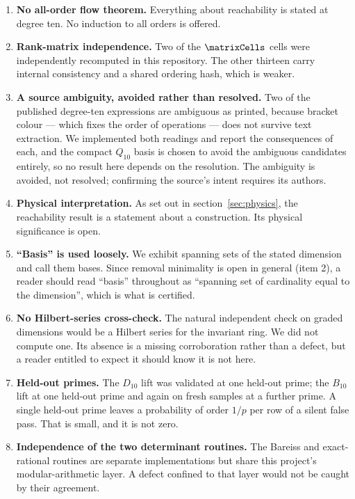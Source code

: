 \documentclass[11pt,a4paper]{article}
\theoremstyle{definition}
\theoremstyle{remark}
\newcommand{\Dten}{D_{10}}
\newcommand{\Qten}{Q_{10}}
\newcommand{\Bten}{B_{10}}
\begin{document}
\begin{enumerate}
\item \textbf{No all-order flow theorem.} Everything about reachability is stated
at degree ten. No induction to all orders is offered.

\item \textbf{Rank-matrix independence.} Two of the $\matrixCells$ cells were
independently recomputed in this repository. The other thirteen carry internal
consistency and a shared ordering hash, which is weaker.

\item \textbf{A source ambiguity, avoided rather than resolved.} Two of the
published degree-ten expressions are ambiguous as printed, because bracket colour
--- which fixes the order of operations --- does not survive text extraction. We
implemented both readings and report the consequences of each, and the compact
$\Qten$ basis is chosen to avoid the ambiguous candidates entirely, so no result
here depends on the resolution. The ambiguity is avoided, not resolved;
confirming the source's intent requires its authors.

\item \textbf{Physical interpretation.} As set out in
section~\ref{sec:physics}, the reachability result is a statement about a
construction. Its physical significance is open.

\item \textbf{``Basis'' is used loosely.} We exhibit spanning sets of the stated
dimension and call them bases. Since removal minimality is open in general
(item 2), a reader should read ``basis'' throughout as ``spanning set of
cardinality equal to the dimension'', which is what is certified.

\item \textbf{No Hilbert-series cross-check.} The natural independent check on
graded dimensions would be a Hilbert series for the invariant ring. We did not
compute one. Its absence is a missing corroboration rather than a defect, but a
reader entitled to expect it should know it is not here.

\item \textbf{Held-out primes.} The $\Dten$ lift was validated at one held-out
prime; the $\Bten$ lift at one held-out prime and again on fresh samples at a
further prime. A single held-out prime leaves a probability of order $1/p$ per
row of a silent false pass. That is small, and it is not zero.

\item \textbf{Independence of the two determinant routines.} The Bareiss and
exact-rational routines are separate implementations but share this project's
modular-arithmetic layer. A defect confined to that layer would not be caught by
their agreement.


\end{enumerate}
\end{document}
